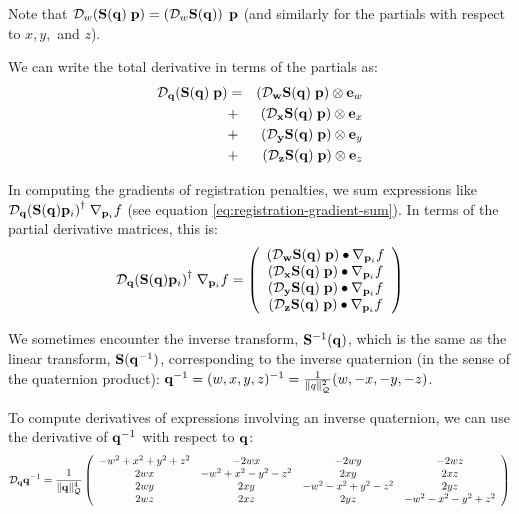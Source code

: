 Note that
${\mathcal D}_{w}{\left( {\mathbf S}({\mathbf q}) \; {\mathbf p} \right)}
 = \left( {\mathcal D}_{w}{{\mathbf S}({\mathbf q})}\right) \; {\mathbf p}$
(and similarly for the partials with respect to $x,y,$ and $z$).

We can write the total derivative in terms of the partials as:
\begin{eqnarray}
{\mathcal D}_{{\mathbf q}}{\left( {\mathbf S}({\mathbf q}) \; {\mathbf p} \right)}
& = &
\left( {\mathcal D}_{{\mathbf w}}{{\mathbf S}({\mathbf q})} \; {\mathbf p} \right) \otimes {\mathbf e}_w
\\
& + &
\left( {\mathcal D}_{{\mathbf x}}{{\mathbf S}({\mathbf q})} \; {\mathbf p} \right) \otimes {\mathbf e}_x
\nonumber
\\
& + &
\left( {\mathcal D}_{{\mathbf y}}{{\mathbf S}({\mathbf q})} \; {\mathbf p} \right) \otimes {\mathbf e}_y
\nonumber
\\
& + &
\left( {\mathcal D}_{{\mathbf z}}{{\mathbf S}({\mathbf q})} \; {\mathbf p} \right) \otimes {\mathbf e}_z
\nonumber
\end{eqnarray}

In computing the gradients of registration penalties,
we sum expressions like
${\mathcal D}_{{\mathbf q}}{\left( {\mathbf S}({\mathbf q}){\mathbf p}_i \right)}^{\dagger} \;
{\mathbf \nabla}_{{\mathbf p}_i}{f}$
(see equation \ref{eq:registration-gradient-sum}).
In terms of the partial derivative matrices,
this is:
\begin{equation}
{\mathcal D}_{{\mathbf q}}{\left( {\mathbf S}({\mathbf q}){\mathbf p}_i \right)}^{\dagger} \;
{\mathbf \nabla}_{{\mathbf p}_i}{f}
=
\left(
\begin{array}{c}
\left( {\mathcal D}_{{\mathbf w}}{{\mathbf S}({\mathbf q})} \; {\mathbf p} \right) \bullet {\mathbf \nabla}_{{\mathbf p}_i}{f} \\
\left( {\mathcal D}_{{\mathbf x}}{{\mathbf S}({\mathbf q})} \; {\mathbf p} \right) \bullet {\mathbf \nabla}_{{\mathbf p}_i}{f} \\
\left( {\mathcal D}_{{\mathbf y}}{{\mathbf S}({\mathbf q})} \; {\mathbf p} \right) \bullet {\mathbf \nabla}_{{\mathbf p}_i}{f} \\
\left( {\mathcal D}_{{\mathbf z}}{{\mathbf S}({\mathbf q})} \; {\mathbf p} \right) \bullet {\mathbf \nabla}_{{\mathbf p}_i}{f} \\
\end{array}
\right)
\end{equation}

We sometimes encounter the inverse transform, ${\mathbf S}^{-1}({\mathbf q})$,
which is the same as the linear transform,
${\mathbf S}({\mathbf q}^{-1})$,
corresponding to the inverse quaternion
(in the sense of the quaternion product):
${\mathbf q}^{-1} = (w, x, y, z)^{-1}
         = {1 \over {\| q \|_{\mathcal{Q}}^2}} (w, -x, -y, -z)$.

To compute derivatives of expressions
involving an inverse quaternion,
we can use the derivative of ${\mathbf q}^{-1}$
with respect to ${\mathbf q}$:
\begin{equation}
{\mathcal D}_{{\mathbf q}}{{\mathbf q}^{-1}}
=
{1 \over {\| {\mathbf q}\|_{\mathcal{Q}}^4}}
\left(
\begin{array}{cccc}
-w^2+x^2+y^2+z^2 & -2wx              & -2wy              & -2wz \\
 2wx             & -w^2+x^2-y^2-z^2  &  2xy              &  2xz \\
 2wy             &   2xy             & -w^2-x^2+y^2-z^2  &  2yz \\
 2wz             &   2xz             &  2yz              &  -w^2-x^2-y^2+z^2 \\
\end{array}
\right)
\end{equation}

